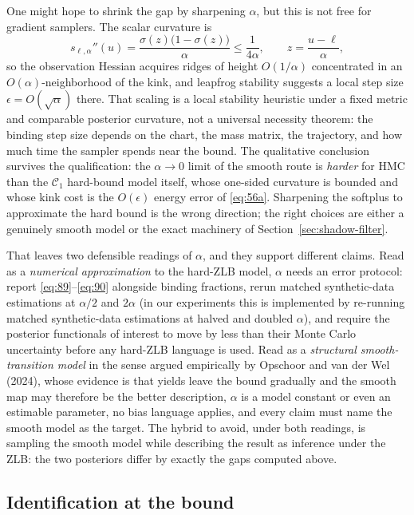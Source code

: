 \documentclass[11pt]{article}
\begin{document}
One might hope to shrink the gap by sharpening \(\alpha\), but this is
not free for gradient samplers. The scalar curvature is
\begin{equation}\label{eq:91}
 s_{\ell,\alpha}''(u)=\frac{\sigma(z)\bigl(1-\sigma(z)\bigr)}{\alpha}
 \leq\frac1{4\alpha},
 \qquad z=\frac{u-\ell}{\alpha},
\end{equation}
so the observation Hessian acquires ridges of height \(O(1/\alpha)\)
concentrated in an \(O(\alpha)\)-neighborhood of the kink, and leapfrog
stability suggests a local step size \(\epsilon=O(\sqrt\alpha)\) there.
That scaling is a local stability heuristic under a fixed metric and
comparable posterior curvature, not a universal necessity theorem: the
binding step size depends on the chart, the mass matrix, the
trajectory, and how much time the sampler spends near the bound. The
qualitative conclusion survives the qualification: the \(\alpha\to0\)
limit of the smooth route is \emph{harder} for HMC than the
\(\mathcal C_1\) hard-bound model itself, whose one-sided curvature is
bounded and whose kink cost is the \(O(\epsilon)\) energy error of
\eqref{eq:56a}. Sharpening the softplus to approximate the hard bound
is the wrong direction; the right choices are either a genuinely smooth
model or the exact machinery of Section~\ref{sec:shadow-filter}.

That leaves two defensible readings of \(\alpha\), and they support
different claims. Read as a \emph{numerical approximation} to the hard-ZLB model,
\(\alpha\) needs an error protocol: report
\eqref{eq:89}--\eqref{eq:90} alongside binding fractions, rerun matched
synthetic-data estimations at \(\alpha/2\) and \(2\alpha\) (in our
experiments this is implemented by re-running matched synthetic-data
estimations at halved and doubled \(\alpha\)), and require the
posterior functionals of interest to move by less than their Monte
Carlo uncertainty before any hard-ZLB language is used. Read as a
\emph{structural smooth-transition model} in the sense argued
empirically by Opschoor and van der Wel (2024), whose evidence is that
yields leave the bound gradually and the smooth map may therefore be the
better description,
\(\alpha\) is a model constant or even an estimable parameter, no bias
language applies, and every claim must name the smooth model as the
target. The hybrid to avoid, under both readings, is sampling the smooth
model while describing the result as inference under the ZLB: the two
posteriors differ by exactly the gaps computed above.

\subsection{Identification at the bound}
\label{sec:shadow-ident}
\end{document}
